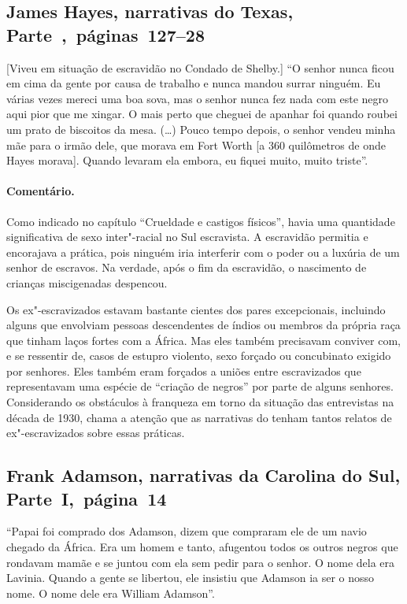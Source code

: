 \subsection{James Hayes, narrativas do Texas, Parte~,~páginas~127--28}
\label{ref130}

{[}Viveu em situação de escravidão no Condado de Shelby.{]} ``O senhor nunca ficou em cima da gente por causa de trabalho e nunca
mandou surrar ninguém. Eu várias vezes mereci uma boa sova, mas o senhor
nunca fez nada com este negro aqui pior que me xingar. O mais perto que
cheguei de apanhar foi quando roubei um prato de biscoitos da mesa.
(\ldots{}) Pouco tempo depois, o senhor vendeu minha mãe para o irmão
dele, que morava em Fort Worth {[}a 360 quilômetros de onde Hayes morava{]}.
Quando levaram ela embora, eu fiquei muito, muito triste''.

\paragraph{Comentário.}\quad
{\small
Como indicado no capítulo ``Crueldade e castigos físicos'', havia uma quantidade significativa de
sexo inter"-racial no Sul escravista. A escravidão permitia e encorajava
a prática, pois ninguém iria interferir com o poder ou a luxúria de um
senhor de escravos. Na verdade, após o fim da escravidão, o nascimento
de crianças miscigenadas despencou.

Os ex"-escravizados estavam bastante cientes dos pares excepcionais,
incluindo alguns que envolviam pessoas descendentes de índios ou membros
da própria raça que tinham laços fortes com a África. Mas eles também
precisavam conviver com, e se ressentir de, casos de estupro violento,
sexo forçado ou concubinato exigido por senhores. Eles também eram
forçados a uniões entre escravizados que representavam uma espécie de
``criação de negros'' por parte de alguns senhores. Considerando os
obstáculos à franqueza em torno da situação das entrevistas na década de
1930, chama a atenção que as narrativas do  tenham tantos relatos de
ex"-escravizados sobre essas práticas.
}

\subsection{Frank Adamson, narrativas da Carolina do Sul, Parte~I,~página~14} \label{ref05}

``Papai foi comprado dos Adamson, dizem que compraram ele de um navio
chegado da África. Era um homem e tanto, afugentou todos os outros
negros que rondavam mamãe e se juntou com ela sem pedir para o senhor. O
nome dela era Lavinia. Quando a gente se libertou, ele insistiu que
Adamson ia ser o nosso nome. O nome dele era William Adamson''.

